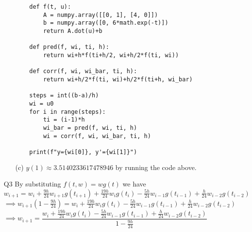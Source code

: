 \documentclass{article}
\begin{document}
\begin{itemize}
\begin{itemize}
\begin{verbatim}
    def f(t, u):
        A = numpy.array([[0, 1], [4, 0]])
        b = numpy.array([0, 6*math.exp(-t)])
        return A.dot(u)+b

    def pred(f, wi, ti, h):
        return wi+h*f(ti+h/2, wi+h/2*f(ti, wi))

    def corr(f, wi, wi_bar, ti, h):
        return wi+h/2*f(ti, wi)+h/2*f(ti+h, wi_bar)

    steps = int((b-a)/h)
    wi = u0
    for i in range(steps):
        ti = (i-1)*h
        wi_bar = pred(f, wi, ti, h)
        wi = corr(f, wi, wi_bar, ti, h)

    print(f"y={wi[0]}, y'={wi[1]}")
        \end{verbatim}
              \item [(c)] $y(1)\approx \boxed{3.5140233617478946}$ by running the code above.
          \end{itemize}
    \item [Q3] By substituting $f(t,w)=wg(t)$ we have\\$w_{i+1}=w_i+\frac{9h}{24}w_{i+1}g(t_{i+1})+\frac{19h}{24}w_ig(t_i)-\frac{5h}{24}w_{i-1}g(t_{i-1})+\frac{h}{24}w_{i-2}g(t_{i-2})$\\$\implies w_{i+1}(1-\frac{9h}{24})=w_i+\frac{19h}{24}w_ig(t_i)-\frac{5h}{24}w_{i-1}g(t_{i-1})+\frac{h}{24}w_{i-2}g(t_{i-2})$\\$\implies \boxed{w_{i+1}=\dfrac{w_i+\frac{19h}{24}w_ig(t_i)-\frac{5h}{24}w_{i-1}g(t_{i-1})+\frac{h}{24}w_{i-2}g(t_{i-2})}{1-\frac{9h}{24}}}$
\end{itemize}
\end{document}
